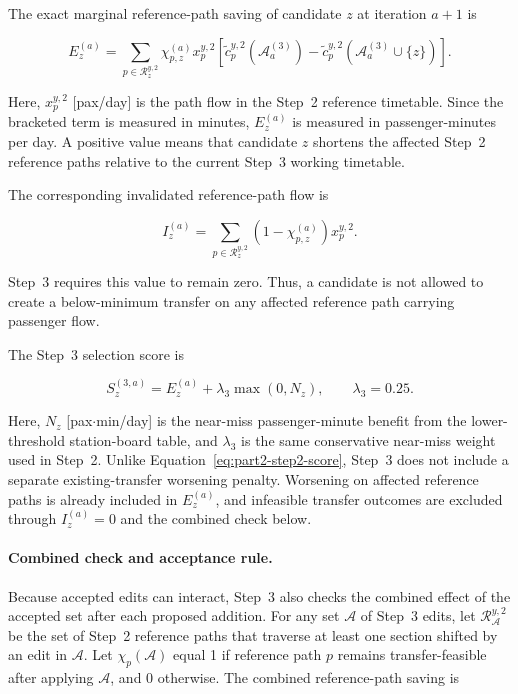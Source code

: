 \documentclass[preprint,12pt]{elsarticle}
\begin{document}
The exact marginal reference-path saving of candidate \(z\) at iteration \(a+1\) is

\begin{equation}
E_z^{(a)}
=
\sum_{p\in\mathcal{R}^{y,2}_z}
\chi_{p,z}^{(a)}
x_p^{y,2}
\left[
\widetilde c_p^{y,2}\!\left(\mathcal{A}^{(3)}_a\right)
-
\widetilde c_p^{y,2}\!\left(\mathcal{A}^{(3)}_a\cup\{z\}\right)
\right].
\label{eq:part2-step3-marginal-saving}
\end{equation}

Here, \(x_p^{y,2}\) [pax/day] is the path flow in the Step~2 reference timetable. Since the bracketed term is measured in minutes, \(E_z^{(a)}\) is measured in passenger-minutes per day. A positive value means that candidate \(z\) shortens the affected Step~2 reference paths relative to the current Step~3 working timetable.

The corresponding invalidated reference-path flow is

\begin{equation}
I_z^{(a)}
=
\sum_{p\in\mathcal{R}^{y,2}_z}
\left(1-\chi_{p,z}^{(a)}\right)
x_p^{y,2}.
\label{eq:part2-step3-invalidated-flow}
\end{equation}

Step~3 requires this value to remain zero. Thus, a candidate is not allowed to create a below-minimum transfer on any affected reference path carrying passenger flow.

The Step~3 selection score is

\begin{equation}
S_z^{(3,a)}
=
E_z^{(a)}
+
\lambda_3\max(0,N_z),
\qquad
\lambda_3=0.25.
\label{eq:part2-step3-score}
\end{equation}

Here, \(N_z\) [pax\(\cdot\)min/day] is the near-miss passenger-minute benefit from the lower-threshold station-board table, and \(\lambda_3\) is the same conservative near-miss weight used in Step~2. Unlike Equation~\eqref{eq:part2-step2-score}, Step~3 does not include a separate existing-transfer worsening penalty. Worsening on affected reference paths is already included in \(E_z^{(a)}\), and infeasible transfer outcomes are excluded through \(I_z^{(a)}=0\) and the combined check below.

\paragraph*{Combined check and acceptance rule.}
Because accepted edits can interact, Step~3 also checks the combined effect of the accepted set after each proposed addition. For any set \(\mathcal{A}\) of Step~3 edits, let \(\mathcal{R}^{y,2}_{\mathcal{A}}\) be the set of Step~2 reference paths that traverse at least one section shifted by an edit in \(\mathcal{A}\). Let \(\chi_p(\mathcal{A})\) equal 1 if reference path \(p\) remains transfer-feasible after applying \(\mathcal{A}\), and 0 otherwise. The combined reference-path saving is
\end{document}
